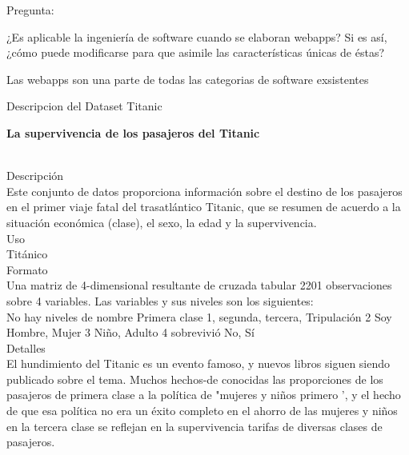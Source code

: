 \documentclass{report}
\begin{document}
\newpage
\normalsize{}
\begin{justify}

Pregunta:

¿Es aplicable la ingeniería de software cuando se elaboran webapps? Si es así, ¿cómo puede modificarse para que asimile las características únicas de éstas?




Las webapps son una parte de todas las categorias de software exsistentes

\newpage

Descripcion del Dataset Titanic

\begin{center}\huge{}\textbf{La supervivencia de los pasajeros del Titanic\\ \ \\}\end{center}


Descripción \\

Este conjunto de datos proporciona información sobre el destino de los pasajeros en el primer viaje fatal del trasatlántico Titanic, que se resumen de acuerdo a la situación económica (clase), el sexo, la edad y la supervivencia.\\

Uso\\

  Titánico\\

Formato\\

Una matriz de 4-dimensional resultante de cruzada tabular 2201 observaciones sobre 4 variables. Las variables y sus niveles son los siguientes:\\

No hay niveles de nombre
Primera clase 1, segunda, tercera, Tripulación
2 Soy Hombre, Mujer
3 Niño, Adulto
4 sobrevivió No, Sí\\
Detalles\\

El hundimiento del Titanic es un evento famoso, y nuevos libros siguen siendo publicado sobre el tema. Muchos hechos-de conocidas las proporciones de los pasajeros de primera clase a la política de "mujeres y niños primero ', y el hecho de que esa política no era un éxito completo en el ahorro de las mujeres y niños en la tercera clase se reflejan en la supervivencia tarifas de diversas clases de pasajeros.\\


\end{justify}
\end{document}
